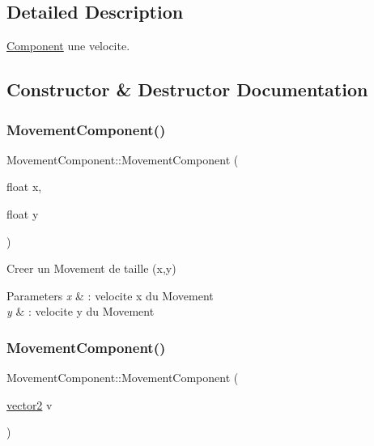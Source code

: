 \subsection{Detailed Description}
\hyperlink{class_component}{Component} une velocite. 

\subsection{Constructor \& Destructor Documentation}
\hypertarget{class_movement_component_a2fa2f87c3e4cdc69489e5ce06a131fd1}{}\label{class_movement_component_a2fa2f87c3e4cdc69489e5ce06a131fd1} 
\subsubsection{\texorpdfstring{Movement\+Component()}{MovementComponent()}\hspace{0.1cm}{\footnotesize\ttfamily [1/2]}}
{\footnotesize\ttfamily Movement\+Component\+::\+Movement\+Component (\begin{DoxyParamCaption}\item[{float}]{x,  }\item[{float}]{y }\end{DoxyParamCaption})\hspace{0.3cm}{\ttfamily [inline]}}



Creer un Movement de taille (x,y) 


\begin{DoxyParams}{Parameters}
{\em x} & \+: velocite x du Movement \\
\hline
{\em y} & \+: velocite y du Movement \\
\hline
\end{DoxyParams}
\hypertarget{class_movement_component_ac9432753c0b29b1206e04c139e56c757}{}\label{class_movement_component_ac9432753c0b29b1206e04c139e56c757} 
\subsubsection{\texorpdfstring{Movement\+Component()}{MovementComponent()}\hspace{0.1cm}{\footnotesize\ttfamily [2/2]}}
{\footnotesize\ttfamily Movement\+Component\+::\+Movement\+Component (\begin{DoxyParamCaption}\item[{\hyperlink{structvector2}{vector2}}]{v }\end{DoxyParamCaption})\hspace{0.3cm}{\ttfamily [inline]}}



